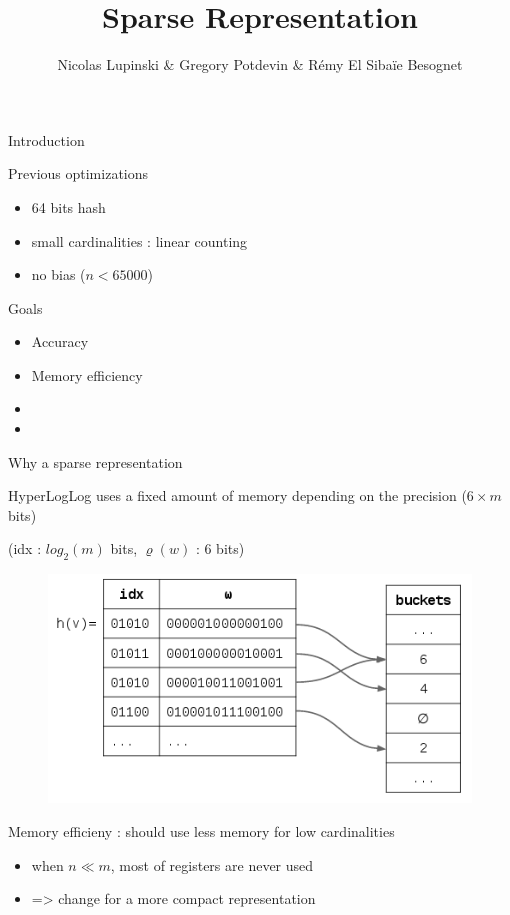 \documentclass{beamer}
\title{Sparse Representation}
\author{Nicolas Lupinski \& Gregory Potdevin \& Rémy El Sibaïe Besognet}
\begin{document}
\begin{frame}
  \titlepage  
\end{frame}


\begin{frame}{Introduction}

\begin{block}{Previous optimizations}
\begin{itemize}
\item 64 bits hash
\item small cardinalities : linear counting
\item no bias ($n < 65000$)
\end{itemize}
\end{block}


\begin{block}{Goals}
\begin{itemize}
\item Accuracy
\item Memory efficiency
\item {} 
\item {} 
\end{itemize}
\end{block}


\end{frame}

\begin{frame}{Why a sparse representation}

HyperLogLog uses a fixed amount of memory depending on the precision ($6\times m$ bits)

(idx : $log_2(m)$ bits, $\varrho(w)$ : 6 bits)

\begin{figure}[c]
\includegraphics [scale=0.5]  {hyperloglog_buckets.png}
\end{figure}

Memory efficieny : should use less memory for low cardinalities
\begin{itemize}
\item when $n \ll m$, most of registers are never used 
\item => change for a more compact representation
\end{itemize}


\end{frame}
\end{document}
